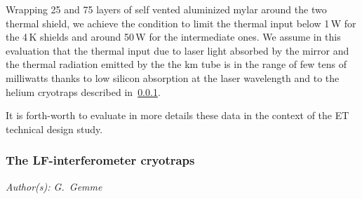 Wrapping  25 and 75 layers of self vented aluminized mylar around the two thermal shield, we achieve   the condition to limit the thermal input 
below 1\,W for the 4\,K shields and  around  50\,W for the intermediate ones.
We assume in this evaluation  that the thermal input due to laser light absorbed by the mirror and the thermal radiation emitted by the the km tube is   in the range of few tens of milliwatts  thanks to low silicon absorption at the laser wavelength and to  the helium cryotraps described in~\ref{subsection_helium_cryotraps}. 

It is forth-worth to  evaluate in more details these data in the context of the ET technical design study.  
\FloatBarrier
\subsubsection{The LF-interferometer cryotraps}
\label {subsection_helium_cryotraps}
\emph{
Author(s): G.\ Gemme}



